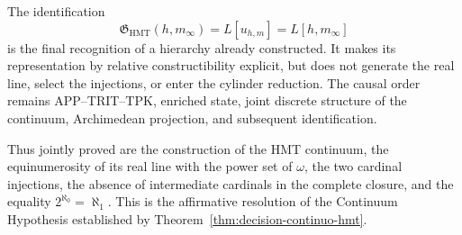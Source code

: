 The identification
\[
 \mathfrak G_{\mathrm{HMT}}(h,m_\infty)
 =L[u_{h,m}]=L[h,m_\infty]
\]
is the final recognition of a hierarchy already constructed. It makes its
representation by relative constructibility explicit, but does not generate
the real line, select the injections, or enter the cylinder reduction. The
causal order remains APP--TRIT--TPK, enriched state, joint discrete structure
of the continuum, Archimedean projection, and subsequent identification.

Thus jointly proved are the construction of the HMT continuum, the
equinumerosity of its real line with the power set of \(\omega\), the two
cardinal injections, the absence of intermediate cardinals in the complete
closure, and the equality \(2^{\aleph_0}=\aleph_1\). This is the affirmative
resolution of the Continuum Hypothesis established by
Theorem~\ref{thm:decision-continuo-hmt}.

\endgroup
